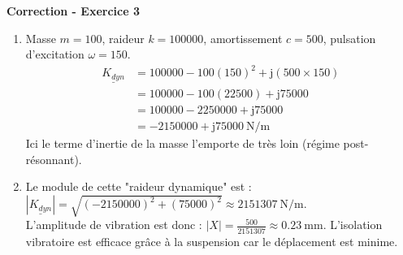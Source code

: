 \documentclass[11pt,a4paper]{article}
\newcommand{\jc}{\mathrm{j}} %
\newcommand{\cpx}[1]{\underline{#1}} %
\begin{document}
\textbf{Correction - Exercice 3}
\begin{enumerate}
    \item Masse $m=100$, raideur $k=100000$, amortissement $c=500$, pulsation d'excitation $\omega = 150$.
    \begin{align*}
        \cpx{K_{dyn}} &= 100000 - 100(150)^2 + \jc(500 \times 150) \\
                      &= 100000 - 100(22500) + \jc 75000 \\
                      &= 100000 - 2250000 + \jc 75000 \\
                      &= -2150000 + \jc 75000 \ \text{N/m}
    \end{align*}
    Ici le terme d'inertie de la masse l'emporte de très loin (régime post-résonnant).
    \item Le module de cette "raideur dynamique" est : $|\cpx{K_{dyn}}| = \sqrt{(-2150000)^2 + (75000)^2} \approx 2151307\ \text{N/m}$. \\
    L'amplitude de vibration est donc : $|X| = \frac{500}{2151307} \approx \SI{0.23}{\milli\meter}$. L'isolation vibratoire est efficace grâce à la suspension car le déplacement est minime.
\end{enumerate}
\end{document}
